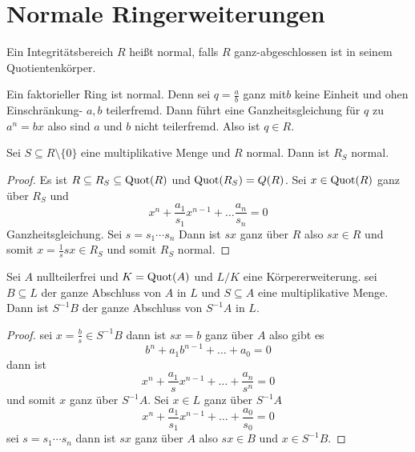 \section{Normale Ringerweiterungen}
\begin{Def}
	Ein Integritätsbereich \(R\) heißt normal, falls \(R\) ganz-abgeschlossen ist in seinem Quotientenkörper.
\end{Def}
\begin{Bem}\label{Bem:FaktNormal}
	Ein faktorieller Ring ist normal. Denn sei \(q=\frac a b\) ganz mit\(b\) keine Einheit und ohen Einschränkung- \(a,b\) teilerfremd.
	Dann führt eine Ganzheitsgleichung für \(q\) zu \(a^n=bx\) also sind \(a\) und \(b\) nicht teilerfremd. Also ist \(q\in R\).
\end{Bem}
\begin{Lemma}
	Sei \(S\subseteq R\setminus\{0\}\) eine multiplikative Menge und \(R\) normal. Dann ist \(R_S\) normal.
\end{Lemma}
\begin{proof}
	Es ist \(R\subseteq R_S\subseteq \operatorname{Quot}(R)\) und \(\operatorname{Quot}(R_S)=Q(R)\).
	Sei \(x\in \operatorname{Quot}(R)\) ganz über \(R_S\) und \[x^n+\frac{a_1}{s_1}x^{n-1}+\dots \frac{a_n}{s_n}=0\] Ganzheitsgleichung. Sei \(s=s_1\cdots s_n\)
	Dann ist \(sx\) ganz über \(R\) also \(sx\in R\) und somit \(x=\frac 1 s sx\in R_S\) und somit \(R_S\) normal.
\end{proof}
\begin{Lemma}
	Sei \(A\) nullteilerfrei und \(K=\operatorname{Quot}(A)\) und \(L/K\) eine Körpererweiterung. sei \(B\subseteq L\) der ganze Abschluss von \(A\) in \(L\) und \(S\subseteq A\) eine multiplikative Menge. Dann ist \(S^{-1}B\) der ganze Abschluss von \(S^{-1}A\) in \(L\).
\end{Lemma}
\begin{proof}
	sei \(x=\frac bs \in S^{-1}B\) dann ist \(sx=b\) ganz über \(A\) also gibt es \[b^n+a_1b^{n-1}+\dots+a_0=0\] dann ist \[x^n+\frac{a_1}{s}x^{n-1}+\dots+\frac{a_n}{s^n}=0\] und somit \(x\) ganz über \(S^{-1}A\).
	Sei \(x\in L\) ganz über \(S^{-1}A\)
	\[x^n+\frac{a_1}{s_1}x^{n-1}+\dots+\frac{a_0}{s_0}=0\] sei \(s=s_1\cdots s_n\) dann ist \(sx\) ganz über \(A\) also \(sx\in B\) und \(x\in S^{-1}B\).
\end{proof}

